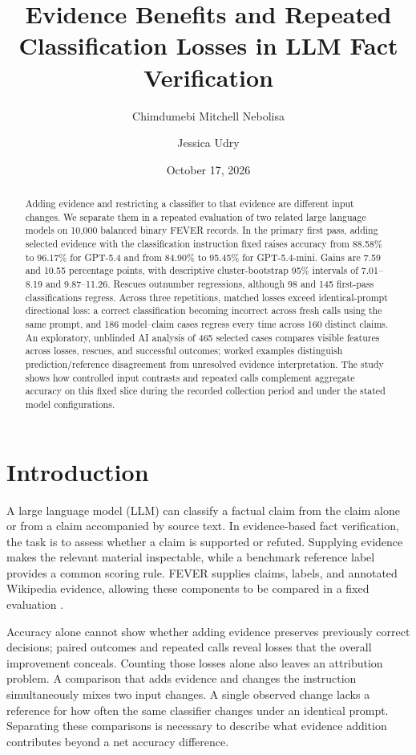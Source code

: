 \documentclass[11pt,letterpaper]{article}
\title{Evidence Benefits and Repeated Classification Losses in LLM Fact Verification}
\author{Chimdumebi Mitchell Nebolisa \and Jessica Udry}
\date{October 17, 2026}
\begin{document}
\maketitle
\begin{abstract}
Adding evidence and restricting a classifier to that evidence are different input changes. We separate them in a repeated evaluation of two related large language models on 10,000 balanced binary FEVER records. In the primary first pass, adding selected evidence with the classification instruction fixed raises accuracy from 88.58\% to 96.17\% for GPT-5.4 and from 84.90\% to 95.45\% for GPT-5.4-mini. Gains are 7.59 and 10.55 percentage points, with descriptive cluster-bootstrap 95\% intervals of 7.01--8.19 and 9.87--11.26. Rescues outnumber regressions, although 98 and 145 first-pass classifications regress. Across three repetitions, matched losses exceed identical-prompt directional loss: a correct classification becoming incorrect across fresh calls using the same prompt, and 186 model--claim cases regress every time across 160 distinct claims. An exploratory, unblinded AI analysis of 465 selected cases compares visible features across losses, rescues, and successful outcomes; worked examples distinguish prediction/reference disagreement from unresolved evidence interpretation. The study shows how controlled input contrasts and repeated calls complement aggregate accuracy on this fixed slice during the recorded collection period and under the stated model configurations.
\end{abstract}

\section{Introduction}\label{sec:intro}
A large language model (LLM) can classify a factual claim from the claim alone or from a claim accompanied by source text. In evidence-based fact verification, the task is to assess whether a claim is supported or refuted. Supplying evidence makes the relevant material inspectable, while a benchmark reference label provides a common scoring rule. FEVER supplies claims, labels, and annotated Wikipedia evidence, allowing these components to be compared in a fixed evaluation \citep{thorne-etal-2018-fever,guo-etal-2022-survey}.

Accuracy alone cannot show whether adding evidence preserves previously correct decisions; paired outcomes and repeated calls reveal losses that the overall improvement conceals. Counting those losses alone also leaves an attribution problem. A comparison that adds evidence and changes the instruction simultaneously mixes two input changes. A single observed change lacks a reference for how often the same classifier changes under an identical prompt. Separating these comparisons is necessary to describe what evidence addition contributes beyond a net accuracy difference.
\end{document}
